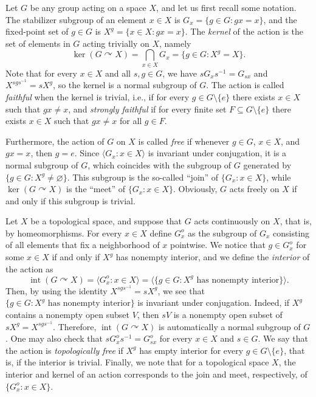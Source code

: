 \documentclass[a4paper]{amsart}
\theoremstyle{plain}
\theoremstyle{definition}
\theoremstyle{remark}
\numberwithin{theorem}{section}
\begin{document}
Let $G$ be any group acting on a space $X$, and let us first recall some notation.
The stabilizer subgroup of an element $x\in X$ is $G_x=\{g\in G:gx=x\}$,
and the fixed-point set of $g\in G$ is $X^g=\{x\in X:gx=x\}$.
The \emph{kernel} of the action is the set of elements in $G$ acting trivially on $X$, namely
\[
\ker(G\curvearrowright X)=\bigcap_{x\in X}G_x=\{g\in G:X^g=X\}.
\]
Note that for every $x\in X$ and all $s,g\in G$,
we have $sG_xs^{-1}=G_{sx}$ and $X^{sgs^{-1}}=sX^g$,
so the kernel is a normal subgroup of $G$.
The action is called \emph{faithful} when the kernel is trivial, i.e.,
if for every $g\in G\setminus\{e\}$ there exists $x\in X$ such that $gx\neq x$,
and \emph{strongly faithful} if for every finite set $F\subseteq G\setminus\{e\}$
there exists $x\in X$ such that $gx\neq x$ for all $g\in F$.

Furthermore, the action of $G$ on $X$ is called \emph{free} if whenever $g\in G$, $x\in X$, and $gx=x$, then $g=e$.
Since $\langle G_x : x\in X \rangle$ is invariant under conjugation, it is a normal subgroup of $G$,
which coincides with the subgroup of $G$ generated by $\{g\in G:X^g\neq\varnothing\}$.
This subgroup is the so-called ``join'' of $\{G_x:x\in X\}$, while $\ker(G\curvearrowright X)$ is the ``meet'' of $\{G_x:x\in X\}$.
Obviously, $G$ acts freely on $X$ if and only if this subgroup is trivial.

Let $X$ be a topological space, and suppose that $G$ acts continuously on $X$, that is, by homeomorphisms.
For every $x\in X$ define $G_x^o$ as the subgroup of $G_x$ consisting of all elements that fix a neighborhood of $x$ pointwise.
We notice that $g\in G_x^o$ for some $x\in X$ if and only if $X^g$ has nonempty interior,
and we define the \emph{interior} of the action as
\begin{equation}\label{eq:interior}
\operatorname{int}(G\curvearrowright X)=\langle G_x^o : x\in X\rangle=\langle\{g\in G:X^g\text{ has nonempty interior}\}\rangle.
\end{equation}
Then, by using the identity $X^{sgs^{-1}}=sX^g$,
we see that $\{g\in G:X^g\text{ has nonempty interior}\}$ is invariant under conjugation.
Indeed, if $X^g$ contains a nonempty open subset $V$, then $sV$ is a nonempty open subset of $sX^g=X^{sgs^{-1}}$.
Therefore, $\operatorname{int}(G\curvearrowright X)$ is automatically a normal subgroup of $G$.
One may also check that $sG_x^os^{-1}=G_{sx}^o$ for every $x\in X$ and $s\in G$.
We say that the action is \emph{topologically free} if $X^g$ has empty interior for every $g\in G\setminus\{e\}$,
that is, if the interior is trivial.
Finally, we note that for a topological space $X$, the interior and kernel of an action corresponds to the join and meet,
respectively, of $\{G_x^o:x\in X\}$.
\end{document}
